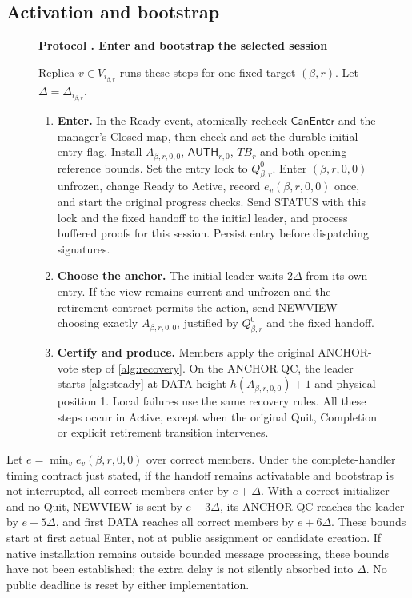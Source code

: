 \documentclass[11pt,a4paper]{article}
\newcommand{\TB}{\mathit{TB}}
\newcommand{\tagg}[1]{\ensuremath{\mathsf{#1}}}
\newcounter{protocol}
\newenvironment{protocol}[3][htbp]{\begin{figure}[#1]\refstepcounter{protocol}\label{#2}
\begin{mdframed}[linewidth=.6pt,skipabove=0pt,skipbelow=0pt,
innertopmargin=7pt,innerbottommargin=7pt]\small
\textbf{Protocol \theprotocol. #3}\par\smallskip}{\end{mdframed}\end{figure}}
\begin{document}
\subsection{Activation and bootstrap}
\label{sec:ready}
\begin{protocol}[H]{alg:bootstrap}{Enter and bootstrap the selected session}
Replica $v\in V_{i_{\beta,r}}$ runs these steps for one fixed target
$(\beta,r)$. Let $\Delta=\Delta_{i_{\beta,r}}$.
\begin{enumerate}[label=\textbf{\arabic*)},itemsep=3pt]
\item \textbf{Enter.} In the Ready event, atomically recheck
$\tagg{CanEnter}$ and the manager's Closed map, then check and set
the durable initial-entry flag. Install $A_{\beta,r,0,0}$,
$\tagg{AUTH}_{r,0}$, $\TB_r$ and both opening reference bounds.
Set the entry lock to $Q^0_{\beta,r}$. Enter $(\beta,r,0,0)$
unfrozen, change Ready to Active, record $e_v(\beta,r,0,0)$ once,
and start the original progress checks. Send STATUS with this lock
and the fixed handoff to the initial leader, and process buffered
proofs for this session. Persist entry before dispatching signatures.
\item \textbf{Choose the anchor.} The initial leader waits
$2\Delta$ from its own entry. If the view remains current and
unfrozen and the retirement contract permits the action, send NEWVIEW
choosing exactly $A_{\beta,r,0,0}$, justified by $Q^0_{\beta,r}$
and the fixed handoff.
\item \textbf{Certify and produce.} Members apply the original
ANCHOR-vote step of \cref{alg:recovery}. On the ANCHOR QC, the leader
starts \cref{alg:steady} at DATA height $h(A_{\beta,r,0,0})+1$
and physical position 1. Local failures use the same recovery rules.
All these steps occur in Active, except when the original Quit,
Completion or explicit retirement transition intervenes.
\end{enumerate}
\end{protocol}

Let $e=\min_v e_v(\beta,r,0,0)$ over correct members. Under the
complete-handler timing contract just stated, if the handoff remains
activatable and bootstrap is not interrupted, all correct members enter
by $e+\Delta$. With a correct initializer and no Quit, NEWVIEW is sent
by $e+3\Delta$, its ANCHOR QC reaches the leader by $e+5\Delta$, and
first DATA reaches all correct members by $e+6\Delta$. These bounds
start at first actual Enter, not at public assignment or candidate creation.
If native installation remains outside bounded message processing, these
bounds have not been established; the extra delay is not silently absorbed
into $\Delta$. No public deadline is reset by either implementation.
\end{document}
